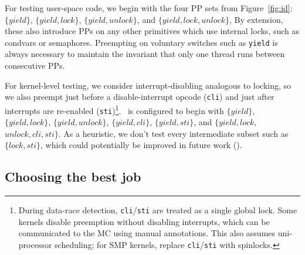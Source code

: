 For testing user-space code, we begin with the four PP sets from Figure~\ref{fig:id}:
$\{yield\}$,
$\{yield,lock\}$,
$\{yield,unlock\}$,
and $\{yield,lock,unlock\}$,
By extension, these also introduce PPs on any other primitives
which use
internal locks,
such as condvars or semaphores.
Preempting on voluntary switches such as {\tt yield} is always necessary to maintain the invariant that only one thread runs between consecutive PPs.

For kernel-level testing, we consider interrupt-disabling analogous to locking,
so we also preempt just before a disable-interrupt opcode ({\tt cli}) and just after interrupts are re-enabled ({\tt sti})\footnote{
During data-race detection, {\tt cli}/{\tt sti} are treated as a single global lock.
Some kernels disable preemption without disabling interrupts,
which can be communicated to the MC using manual annotations. %
This also assumes uni-processor scheduling; for SMP kernels, replace {\tt cli}/{\tt sti} with spinlocks.}.
\quicksand~is configured to begin with
$\{yield\}$,
$\{yield,lock\}$,
$\{yield,unlock\}$,
$\{yield,cli\}$,
$\{yield,sti\}$,
and $\{yield,lock,$ $unlock,cli,sti\}$.
As a heuristic, we don't test every intermediate subset such as $\{lock,sti\}$,
which could potentially be improved in future work (\sect{\ref{sec:future}}).


\subsection{Choosing the best job}

